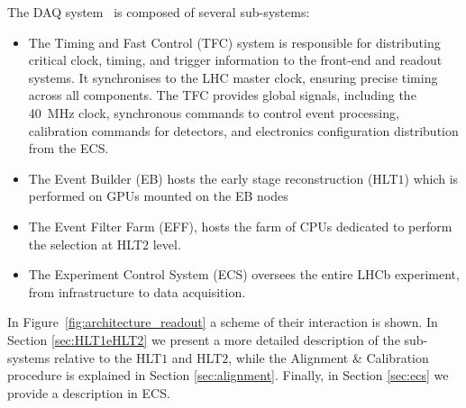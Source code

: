 The DAQ system~\cite{CERN-LHCC-2014-016} is composed of several sub-systems:
\begin{itemize}
\item The Timing and Fast Control (TFC) system is responsible for distributing critical clock, timing, and trigger information to the front-end and readout systems. It synchronises to the LHC master clock, ensuring precise timing across all components. The TFC provides global signals, including the \SI{40}{\mega\hertz} clock, synchronous commands to control event processing, calibration commands for detectors, and electronics configuration distribution from the ECS.

\item The Event Builder (EB) hosts the early stage reconstruction (HLT$1$) which is performed on GPUs mounted on the EB nodes

\item The Event Filter Farm (EFF), hosts the farm of CPUs dedicated to perform the selection at HLT$2$ level.

\item The Experiment Control System (ECS) oversees the entire LHCb experiment, from infrastructure to data acquisition.
\end{itemize}
In Figure~\ref{fig:architecture_readout} a scheme of their interaction is shown.
In Section \ref{sec:HLT1eHLT2} we present a more detailed description of the sub-systems relative to the HLT$1$ and HLT$2$, while the Alignment \& Calibration procedure is explained in Section \ref{sec:alignment}. Finally, in Section \ref{sec:ecs} we provide a description in ECS. 

